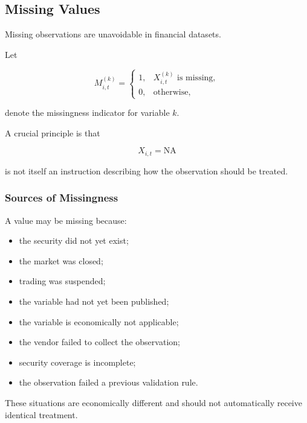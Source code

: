 \documentclass[11pt,a4paper]{article}
\begin{document}
\subsection{Missing Values}
\label{subsec:missing_values}

Missing observations are unavoidable in financial datasets.

Let

\begin{equation}
M_{i,t}^{(k)}
=
\begin{cases}
1,
&
X_{i,t}^{(k)}
\text{ is missing},
\\
0,
&
\text{otherwise},
\end{cases}
\end{equation}

denote the missingness indicator for variable $k$.

A crucial principle is that

\begin{equation}
\boxed{
X_{i,t}=\mathrm{NA}
}
\end{equation}

is not itself an instruction describing how the observation should be treated.


\subsubsection{Sources of Missingness}

A value may be missing because:

\begin{itemize}
    \item the security did not yet exist;
    \item the market was closed;
    \item trading was suspended;
    \item the variable had not yet been published;
    \item the variable is economically not applicable;
    \item the vendor failed to collect the observation;
    \item security coverage is incomplete;
    \item the observation failed a previous validation rule.
\end{itemize}

These situations are economically different and should not automatically
receive identical treatment.
\end{document}
